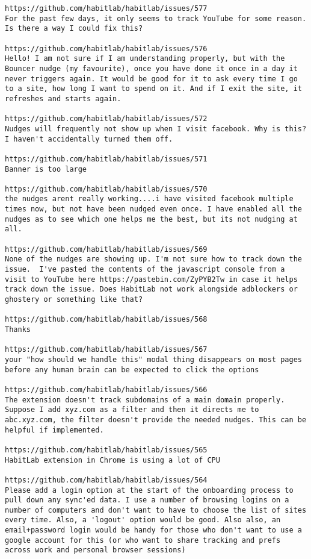 \begin{lstlisting}[breaklines]
https://github.com/habitlab/habitlab/issues/577
For the past few days, it only seems to track YouTube for some reason. Is there a way I could fix this?

https://github.com/habitlab/habitlab/issues/576
Hello! I am not sure if I am understanding properly, but with the Bouncer nudge (my favourite), once you have done it once in a day it never triggers again. It would be good for it to ask every time I go to a site, how long I want to spend on it. And if I exit the site, it refreshes and starts again.

https://github.com/habitlab/habitlab/issues/572
Nudges will frequently not show up when I visit facebook. Why is this? I haven't accidentally turned them off.

https://github.com/habitlab/habitlab/issues/571
Banner is too large

https://github.com/habitlab/habitlab/issues/570
the nudges arent really working....i have visited facebook multiple times now, but not have been nudged even once. I have enabled all the nudges as to see which one helps me the best, but its not nudging at all.

https://github.com/habitlab/habitlab/issues/569
None of the nudges are showing up. I'm not sure how to track down the issue.  I've pasted the contents of the javascript console from a visit to YouTube here https://pastebin.com/ZyPYB2Tw in case it helps track down the issue. Does HabitLab not work alongside adblockers or ghostery or something like that?

https://github.com/habitlab/habitlab/issues/568
Thanks

https://github.com/habitlab/habitlab/issues/567
your "how should we handle this" modal thing disappears on most pages before any human brain can be expected to click the options

https://github.com/habitlab/habitlab/issues/566
The extension doesn't track subdomains of a main domain properly. Suppose I add xyz.com as a filter and then it directs me to abc.xyz.com, the filter doesn't provide the needed nudges. This can be helpful if implemented.

https://github.com/habitlab/habitlab/issues/565
HabitLab extension in Chrome is using a lot of CPU

https://github.com/habitlab/habitlab/issues/564
Please add a login option at the start of the onboarding process to pull down any sync'ed data. I use a number of browsing logins on a number of computers and don't want to have to choose the list of sites every time. Also, a 'logout' option would be good. Also also, an email+password login would be handy for those who don't want to use a google account for this (or who want to share tracking and prefs across work and personal browser sessions)


\end{lstlisting}
